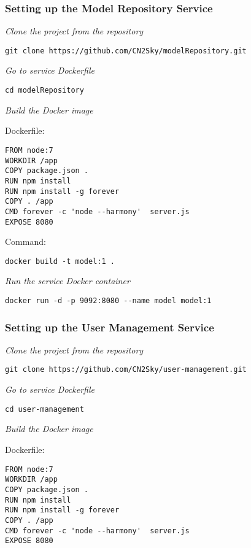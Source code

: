\subsubsection{Setting up the Model Repository Service}\label{model setup}

\emph{Clone the project from the repository}
 \begin{lstlisting}
git clone https://github.com/CN2Sky/modelRepository.git
\end{lstlisting}

\emph{Go to service Dockerfile}
 \begin{lstlisting}
cd modelRepository
\end{lstlisting}

\emph{Build the Docker image}

Dockerfile:
 \begin{lstlisting}
FROM node:7
WORKDIR /app
COPY package.json .
RUN npm install
RUN npm install -g forever
COPY . /app
CMD forever -c 'node --harmony'  server.js
EXPOSE 8080
\end{lstlisting}

Command: 

 \begin{lstlisting}
docker build -t model:1 .
\end{lstlisting}


\emph{Run the service Docker container}
 \begin{lstlisting}
docker run -d -p 9092:8080 --name model model:1
\end{lstlisting}



\subsubsection{Setting up the User Management Service}\label{user setup}

\emph{Clone the project from the repository}
 \begin{lstlisting}
git clone https://github.com/CN2Sky/user-management.git
\end{lstlisting}

\emph{Go to service Dockerfile}
 \begin{lstlisting}
cd user-management
\end{lstlisting}

\emph{Build the Docker image}

Dockerfile:
 \begin{lstlisting}
FROM node:7
WORKDIR /app
COPY package.json .
RUN npm install
RUN npm install -g forever
COPY . /app
CMD forever -c 'node --harmony'  server.js
EXPOSE 8080
\end{lstlisting}

